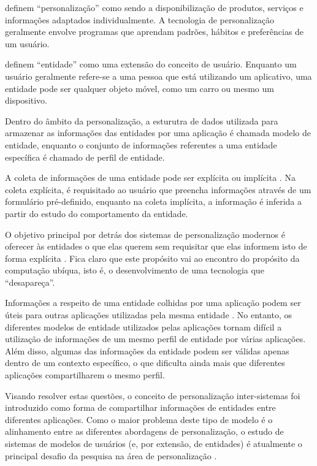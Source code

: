  definem ``personalização'' como sendo a disponibilização de produtos, serviços e informações adaptados individualmente. A tecnologia de personalização geralmente envolve programas que aprendam padrões, hábitos e preferências de um usuário.

 definem ``entidade'' como uma extensão do conceito de usuário. Enquanto um usuário geralmente refere-se a uma pessoa que está utilizando um aplicativo, uma entidade pode ser qualquer objeto móvel, como um carro ou mesmo um dispositivo.

Dentro do âmbito da personalização, a esturutra de dados utilizada para armazenar as informações das entidades por uma aplicação é chamada modelo de entidade, enquanto o conjunto de informações referentes a uma entidade específica é chamado de perfil de entidade.

A coleta de informações de uma entidade pode ser explícita ou implícita \cite{viviani10}. Na coleta explícita, é requisitado ao usuário que preencha informações através de um formulário pré-definido, enquanto na coleta implícita, a informação é inferida a partir do estudo do comportamento da entidade.

O objetivo principal por detrás dos sistemas de personalização modernos é oferecer às entidades o que elas querem sem requisitar que elas informem isto de forma explícita \cite{mulvenna00}. Fica claro que este propósito vai ao encontro do propósito da computação ubíqua, isto é, o desenvolvimento de uma tecnologia que ``desapareça''.

Informações a respeito de uma entidade colhidas por uma aplicação podem ser úteis para outras aplicações utilizadas pela mesma entidade \cite{viviani10}. No entanto, os diferentes modelos de entidade utilizados pelas aplicações tornam difícil a utilização de informações de um mesmo perfil de entidade por várias aplicações. Além disso, algumas das informações da entidade podem ser válidas apenas dentro de um contexto específico, o que dificulta ainda mais que diferentes aplicações compartilharem o mesmo perfil.

Visando resolver estas questões, o conceito de personalização inter-sistemas foi introduzido \cite{niederee04} como forma de compartilhar informações de entidades entre diferentes aplicações. Como o maior problema deste tipo de modelo é o alinhamento entre as diferentes abordagens de personalização, o estudo de sistemas de modelos de usuários (e, por extensão, de entidades) é atualmente o principal desafio da pesquisa na área de personalização \cite{viviani10}.

